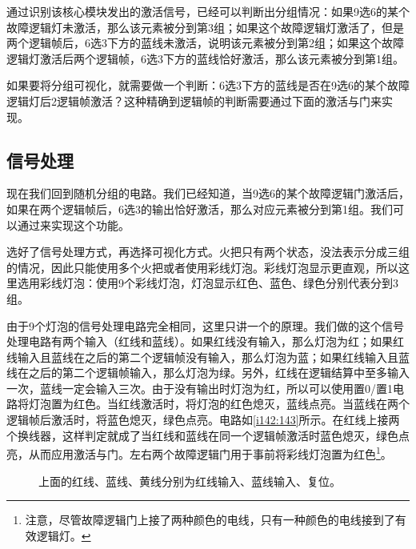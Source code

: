 \begin{figure}[!ht]
\begin{center}
\qquad
{}
\end{center}
\caption{}
\label{i136:137}
\end{figure}

通过识别该核心模块发出的激活信号，已经可以判断出分组情况：如果9选6的某个故障逻辑灯未激活，那么该元素被分到第3组；如果这个故障逻辑灯激活了，但是两个逻辑帧后，6选3下方的蓝线未激活，说明该元素被分到第2组；如果这个故障逻辑灯激活后两个逻辑帧，6选3下方的蓝线恰好激活，那么该元素被分到第1组。

如果要将分组可视化，就需要做一个判断：6选3下方的蓝线是否在9选6的某个故障逻辑灯后2逻辑帧激活？这种精确到逻辑帧的判断需要通过下面的激活与门来实现。

\subsection{信号处理}

现在我们回到随机分组的电路。我们已经知道，当9选6的某个故障逻辑门激活后，如果在两个逻辑帧后，6选3的输出恰好激活，那么对应元素被分到第1组。我们可以通过来实现这个功能。

选好了信号处理方式，再选择可视化方式。火把只有两个状态，没法表示分成三组的情况，因此只能使用多个火把或者使用彩线灯泡。彩线灯泡显示更直观，所以这里选用彩线灯泡：使用9个彩线灯泡，灯泡显示红色、蓝色、绿色分别代表分到3组。

由于9个灯泡的信号处理电路完全相同，这里只讲一个的原理。我们做的这个信号处理电路有两个输入（红线和蓝线）。如果红线没有输入，那么灯泡为红；如果红线输入且蓝线在之后的第二个逻辑帧没有输入，那么灯泡为蓝；如果红线输入且蓝线在之后的第二个逻辑帧输入，那么灯泡为绿。另外，红线在逻辑结算中至多输入一次，蓝线一定会输入三次。由于没有输出时灯泡为红，所以可以使用置0/置1电路将灯泡置为红色。当红线激活时，将灯泡的红色熄灭，蓝线点亮。当蓝线在两个逻辑帧后激活时，将蓝色熄灭，绿色点亮。电路如\autoref{i142:143}所示。在红线上接两个换线器，这样判定就成了当红线和蓝线在同一个逻辑帧激活时蓝色熄灭，绿色点亮，从而应用激活与门。左右两个故障逻辑门用于事前将彩线灯泡置为红色\footnote{注意，尽管故障逻辑门上接了两种颜色的电线，只有一种颜色的电线接到了有效逻辑灯。}。

\begin{figure}[!ht]
\begin{center}
\qquad
{}
\end{center}
\caption{上面的红线、蓝线、黄线分别为红线输入、蓝线输入、复位。}
\label{i142:143}
\end{figure}

